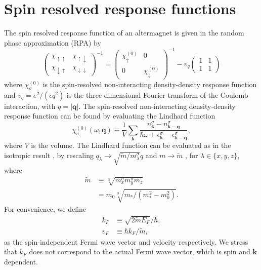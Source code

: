 \documentclass[aps,prb,reprint,twocolumns,superscriptaddress,nofootinbib]{revtex4-2}
\newcommand{\mdos}{\tilde{m}}
\newcommand{\kF}{k_{F}}
\begin{document}
	\section{Spin resolved response functions}
	The spin resolved response function of an altermagnet is given in the random phase approximation (RPA) by \cite{giulianiQuantumTheoryElectron2005}
	\begin{equation}
		\begin{pmatrix}
			\chi_{\uparrow\uparrow} & \chi_{\uparrow\downarrow} \\ 
			\chi_{\downarrow\uparrow} & \chi_{\downarrow\downarrow}
		\end{pmatrix}^{-1} = \begin{pmatrix}
			\chi_\uparrow^{(0)} & 0 \\
			0 & \chi_\downarrow^{(0)}
		\end{pmatrix}^{-1}
		- v_q \begin{pmatrix}
			1 & 1 \\ 1 & 1 
		\end{pmatrix} \label{eq:chi-rpa}
	\end{equation}
	where $\chi_\sigma^{(0)}$ is the spin-resolved non-interacting density-density response function and $v_q=e^2 / (\epsilon q^2)$ is the three-dimensional Fourier transform of the Coulomb interaction, with $q=|\bm q|$. The spin-resolved non-interacting density-density response function can be found by evaluating the Lindhard function
	\begin{equation}
		\chi_\sigma^{(0)}(\omega,\bm q) \equiv \frac{1}{V} \sum_{\bm k} \frac{n_{\bm k}^\sigma - n_{\bm k-\bm q}^\sigma}{\hbar\omega + \epsilon_{\bm k}^\sigma - \epsilon_{\bm k-\bm q}^\sigma},
	\end{equation}
	where $V$ is the volume. The Lindhard function can be evaluated as in the isotropic result \cite{giulianiQuantumTheoryElectron2005}, by rescaling $q_\lambda\rightarrow \sqrt{\mdos/m_\lambda^\sigma} q$ and $m\rightarrow \mdos$ \cite{ahnAnisotropicFermionicQuasiparticles2021}, for $\lambda\in\{x,y,z\}$, 	 where
	\begin{align}
		\mdos&\equiv \sqrt[3]{m^\sigma_xm^\sigma_ym_z} \nonumber\\
		&=m_0\sqrt[3]{m_*/(m_*^2-m_0^2)}.
	\end{align}
	For convenience, we define 
	\begin{align}
		\kF&\equiv\sqrt{2\mdos E_F}/\hbar, \label{eq:kF} \\
		v_F&\equiv \hbar k_F/\mdos,
	\end{align}
	as the spin-independent Fermi wave vector and velocity respectively. We stress that $\kF$ does not correspond to the actual Fermi wave vector, which is spin and $\bm k$ dependent.
	
\end{document}
